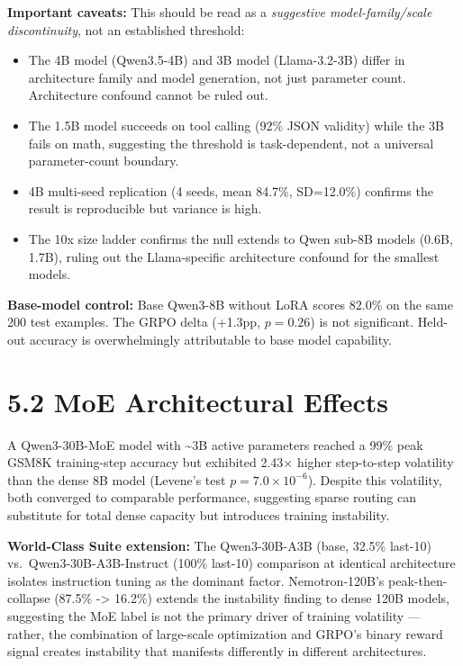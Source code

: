 \documentclass[
  american,
  11pt,
  a4paper,
  oneside]{report}
\providecommand{\tightlist}{%
  \setlength{\itemsep}{0pt}\setlength{\parskip}{0pt}}
\begin{document}
\textbf{Important caveats:} This should be read as a \emph{suggestive
model-family/scale discontinuity}, not an established threshold:

\begin{itemize}
\tightlist
\item
  The 4B model (Qwen3.5-4B) and 3B model (Llama-3.2-3B) differ in
  architecture family and model generation, not just parameter count.
  Architecture confound cannot be ruled out.
\item
  The 1.5B model succeeds on tool calling (92\% JSON validity) while the
  3B fails on math, suggesting the threshold is task-dependent, not a
  universal parameter-count boundary.
\item
  4B multi-seed replication (4 seeds, mean 84.7\%, SD=12.0\%) confirms
  the result is reproducible but variance is high.
\item
  The 10x size ladder confirms the null extends to Qwen sub-8B models
  (0.6B, 1.7B), ruling out the Llama-specific architecture confound for
  the smallest models.
\end{itemize}

\textbf{Base-model control:} Base Qwen3-8B without LoRA scores 82.0\% on
the same 200 test examples. The GRPO delta (+1.3pp, \(p{=}0.26\)) is not
significant. Held-out accuracy is overwhelmingly attributable to base
model capability.

\section{5.2 MoE Architectural Effects}\label{moe-architectural-effects}

A Qwen3-30B-MoE model with \textasciitilde3B active parameters reached a
99\% peak GSM8K training-step accuracy but exhibited 2.43× higher
step-to-step volatility than the dense 8B model (Levene's test
\(p = 7.0 \times 10^{-6}\)). Despite this volatility, both converged to
comparable performance, suggesting sparse routing can substitute for
total dense capacity but introduces training instability.

\textbf{World-Class Suite extension:} The Qwen3-30B-A3B (base, 32.5\%
last-10) vs.~Qwen3-30B-A3B-Instruct (100\% last-10) comparison at
identical architecture isolates instruction tuning as the dominant
factor. Nemotron-120B's peak-then-collapse (87.5\% -\textgreater{}
16.2\%) extends the instability finding to dense 120B models, suggesting
the MoE label is not the primary driver of training volatility ---
rather, the combination of large-scale optimization and GRPO's binary
reward signal creates instability that manifests differently in
different architectures.
\end{document}
